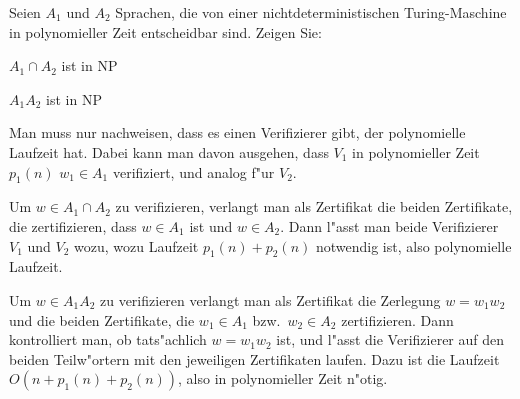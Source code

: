 Seien $A_1$ und $A_2$ Sprachen, die von einer nichtdeterministischen
Turing-Maschine in polynomieller Zeit entscheidbar sind. Zeigen Sie:
\begin{teilaufgaben}
\item $A_1\cap A_2$ ist in NP
\item $A_1A_2$ ist in NP
\end{teilaufgaben}

\begin{loesung}
Man muss nur nachweisen, dass es einen Verifizierer gibt, der polynomielle
Laufzeit hat. Dabei kann man davon ausgehen, dass $V_1$ in polynomieller
Zeit $p_1(n)$ $w_1\in A_1$ verifiziert, und analog f"ur $V_2$.
\begin{teilaufgaben}
\item
Um $w\in A_1\cap A_2$ zu verifizieren, verlangt man als Zertifikat
die beiden Zertifikate, die zertifizieren, dass $w\in  A_1$
ist und $w\in A_2$. Dann l"asst man beide Verifizierer
$V_1$ und $V_2$ wozu, wozu Laufzeit $p_1(n)+p_2(n)$ notwendig ist,
also polynomielle Laufzeit.
\item
Um $w\in A_1A_2$ zu verifizieren verlangt man als Zertifikat
die Zerlegung $w=w_1w_2$ und die beiden Zertifikate, die 
$w_1\in A_1$ bzw.~$w_2\in A_2$ zertifizieren. Dann kontrolliert
man, ob tats"achlich $w=w_1w_2$ ist, und  l"asst
die Verifizierer auf den beiden Teilw"ortern mit den
jeweiligen Zertifikaten laufen.
Dazu ist die Laufzeit
$O(n + p_1(n) + p_2(n))$, also in polynomieller Zeit n"otig.
\qedhere
\end{teilaufgaben}
\end{loesung}
